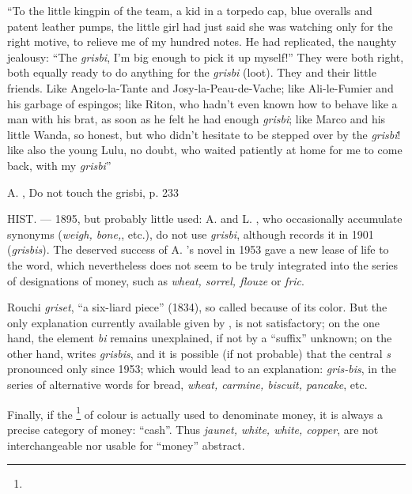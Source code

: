 ``To the little kingpin of the team, a kid in a torpedo cap, blue overalls and patent leather pumps, the little girl had just said she was watching only for the right motive, to relieve me of my hundred notes. He had replicated, the naughty jealousy: ``The \emph{grisbi}, I'm big enough to pick it up myself!'' They were both right, both equally ready to do anything for the \emph{grisbi} (loot). They and their little friends. Like Angelo-la-Tante and Josy-la-Peau-de-Vache; like Ali-le-Fumier and his garbage of espingos; like Riton, who hadn't even known how to behave like a man with his brat, as soon as he felt he had enough \emph{grisbi}; like Marco and his little Wanda, so honest, but who didn't hesitate to be stepped over by the \emph{grisbi}! like also the young Lulu, no doubt, who waited patiently at home for me to come back, with my \emph{grisbi}''

A. , Do not touch the grisbi, p. 233

HIST. --- 1895, but probably little used: A.  and L. , who occasionally accumulate synonyms (\emph{weigh, bone,}, etc.), do not use \emph{grisbi}, although  records it in 1901 (\emph{grisbis}).
The deserved success of A. 's novel in 1953 gave a new lease of life to the word, which nevertheless does not seem to be truly integrated into the series of designations of money, such as \emph{wheat, sorrel, flouze} or \emph{fric}.

Rouchi \emph{griset}, ``a six-liard piece'' (1834), so called because of its color. But the only explanation currently available given by ,  is not satisfactory; on the one hand, the element \emph{bi} remains unexplained, if not by a ``suffix'' unknown; on the other hand,  writes \emph{grisbis}, and it is possible (if not probable) that the central \emph{s} pronounced only since 1953; which would lead to an explanation: \emph{gris-bis}, in the series of alternative words for bread, \emph{wheat, carmine, biscuit, pancake}, etc.

Finally, if the \footnote{\urlMetonymyDef{}} of colour is actually used to denominate money, it is always a precise category of money: ``cash''. Thus \emph{jaunet, white, white, copper}, are not interchangeable nor usable for ``money'' abstract.

